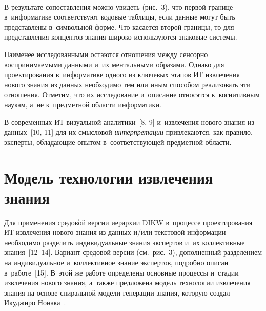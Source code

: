 \begin{multicols}{2}
\begin{figure*}[b] %
\vspace*{9pt}
\begin{center}
   \mbox{%
\epsfxsize=163.149mm 
}
\end{center}
\vspace*{-7pt}
\end{figure*}

  В результате сопоставления можно увидеть (рис.~3), что первой границе 
в~информатике со\-от\-вет\-ст\-ву\-ют кодовые таб\-ли\-цы, если данные могут быть 
пред\-став\-ле\-ны в~символьной фор\-ме. Что касается второй границы, то для 
пред\-став\-ле\-ния концептов знания широко используются знаковые сис\-темы.
  
  Наименее исследованными остаются отношения между сенсорно 
вос\-при\-ни\-ма\-емы\-ми данными и~их ментальными образами. Однако для 
проектирования в~информатике одного из ключевых этапов 
ИТ извлечения нового знания из данных необходимо тем или иным 
способом реализовать эти отношения. Отметим, что их исследование 
и~описание относятся к~когнитивным наукам, а~не к~предметной об\-ласти 
ин\-фор\-ма\-тики.
  
  В современных ИТ визуальной аналитики~[8, 9] 
и~извлечения нового знания из данных~[10, 11] для их смыс\-ло\-вой 
\textit{интерпретации} привлекаются, как правило, эксперты, об\-ла\-да\-ющие 
опытом в~со\-от\-вет\-ст\-ву\-ющей предметной об\-ласти.
  
\section{Модель технологии извлечения знания}

\vspace*{-15pt}

  Для применения средов$\acute{\mbox{о}}$й версии иерархии \mbox{DIKW} 
в~процессе проектирования ИТ извлечения нового 
знания из данных и/или текс\-то\-вой информации необходимо разделить 
индивидуальные знания экспертов и~их коллективные знания~[12--14]. Вариант 
средов$\acute{\mbox{о}}$й версии (см.\ рис.~3), дополненный разделением 
на индивидуальное и~коллективное знание экспертов, по\-дроб\-но описан 
в~работе~[15]. В~этой же работе определены основные процессы и~стадии 
извлечения нового знания, а~так\-же предложена модель технологии извлечения 
знания на основе спиральной модели генерации знания, которую создал 
Икуджиро Нонака~\cite{12-zatsm}.
  

\end{multicols}
